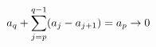 \documentclass[preview]{standalone}
\begin{document}
\begin{align*}
\special{dvisvgm:raw <g id='unique000'>}a_q+\sum_{j=p}^{q-1}(a_j-a_{j+1})=a_p\to0\special{dvisvgm:raw </g>}
\end{align*}
\end{document}

